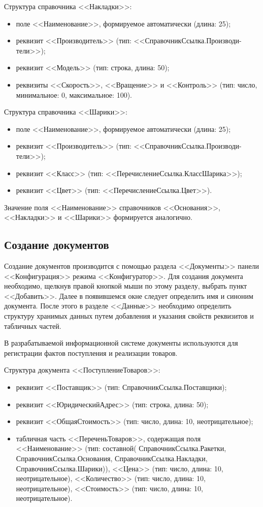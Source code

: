 Структура справочника <<Накладки>>:
\begin{itemize}
\item поле <<Наименование>>, формируемое автоматически (длина: 25);
\item реквизит <<Производитель>> (тип: <<СправочникСсылка.Производи-тели>>);
\item реквизит <<Модель>> (тип: строка, длина: 50);
\item реквизиты <<Скорость>>, <<Вращение>> и <<Контроль>>
  (тип: число, минимальное: 0, максимальное: 100).
\end{itemize}

Структура справочника <<Шарики>>:
\begin{itemize}
\item поле <<Наименование>>, формируемое автоматически (длина: 25);
\item реквизит <<Производитель>> (тип: <<СправочникСсылка.Производи-тели>>);
\item реквизит <<Класс>> (тип: <<ПеречислениеСсылка.КлассШарика>>);
\item реквизит <<Цвет>> (тип: <<ПеречислениеСсылка.Цвет>>).
\end{itemize}

Значение поля <<Наименование>> справочников <<Основания>>, <<Накладки>> и <<Шарики>>
формируется аналогично.

\subsection{Создание документов}

Создание документов производится с помощью раздела <<Документы>>
панели <<Конфигурация>> режима <<Конфигуратор>>.
Для создания документа необходимо, щелкнув правой кнопкой мыши по этому
разделу, выбрать пункт <<Добавить>>. Далее в появившемся окне
следует определить имя и синоним документа.
После этого в разделе <<Данные>> необходимо определить структуру
хранимых данных путем добавления и указания свойств реквизитов
и табличных частей.

В разрабатываемой информационной системе документы используются для
регистрации фактов поступления и реализации товаров.

Структура документа <<ПоступлениеТоваров>>:
\begin{itemize}
\item реквизит <<Поставщик>> (тип: СправочникСсылка.Поставщики);
\item реквизит <<ЮридическийАдрес>> (тип: строка, длина: 50);
\item реквизит <<ОбщаяСтоимость>> (тип: число, длина: 10, неотрицательное);
\item табличная часть <<ПереченьТоваров>>, содержащая поля
  <<Наименование>> (тип: составной(%
  СправочникСсылка.Ракетки,
  СправочникСсылка.Основания,
  СправочникСсылка.Накладки,
  СправочникСсылка.Шарики)),
  <<Цена>> (тип: число, длина: 10, неотрицательное),
  <<Количество>> (тип: число, длина: 10, неотрицательное),
  <<Стоимость>> (тип: число, длина: 10, неотрицательное).
\end{itemize}

